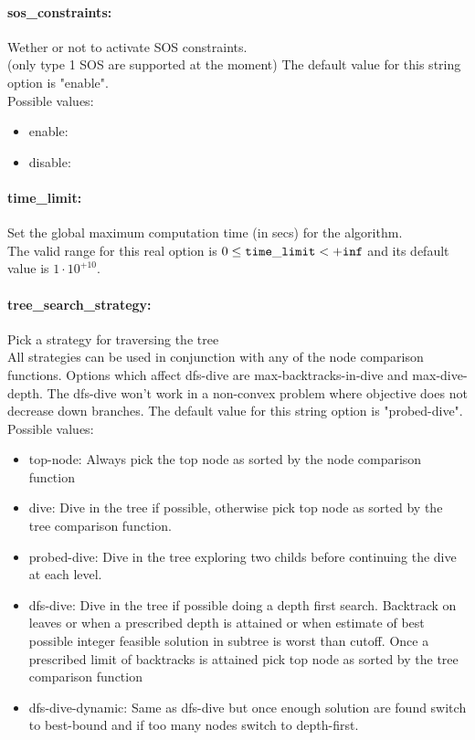 \paragraph{\bf sos\_constraints:}\label{sec:sos_constraints} Wether or not to activate SOS constraints. $\;$ \\
 (only type 1 SOS are supported at the moment)
The default value for this string option is "enable".
\\ 
Possible values:
\begin{itemize}
   \item enable: 
   \item disable: 
\end{itemize}

\paragraph{\bf time\_limit:}\label{sec:time_limit} Set the global maximum computation time (in secs) for the algorithm. $\;$ \\
 The valid range for this real option is 
$0 \le {\tt time\_limit } <  {\tt +inf}$
and its default value is $1 \cdot 10^{+10}$.


\paragraph{\bf tree\_search\_strategy:}\label{sec:tree_search_strategy} Pick a strategy for traversing the tree $\;$ \\
 All strategies can be used in conjunction with
any of the node comparison functions. Options
which affect dfs-dive are max-backtracks-in-dive
and max-dive-depth. The dfs-dive won't work in a
non-convex problem where objective does not
decrease down branches.
The default value for this string option is "probed-dive".
\\ 
Possible values:
\begin{itemize}
   \item top-node:  Always pick the top node as sorted by the node
comparison function
   \item dive: Dive in the tree if possible, otherwise pick
top node as sorted by the tree comparison
function.
   \item probed-dive: Dive in the tree exploring two childs before
continuing the dive at each level.
   \item dfs-dive: Dive in the tree if possible doing a depth
first search. Backtrack on leaves or when a
prescribed depth is attained or when estimate
of best possible integer feasible solution in
subtree is worst than cutoff. Once a prescribed
limit of backtracks is attained pick top node
as sorted by the tree comparison function
   \item dfs-dive-dynamic: Same as dfs-dive but once enough solution are
found switch to best-bound and if too many
nodes switch to depth-first.
\end{itemize}

